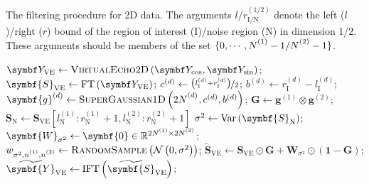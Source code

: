 \begin{algorithm}[h!]
    \begin{algorithmic}[1]
        \caption[
            The filtering procedure for 2D data.
        ]{
            The filtering procedure for 2D data. The arguments
            $l/r_{\text{I/N}}^{(1/2)}$ denote the left ($l$)/right ($r$) bound
            of the region of interest (I)/noise region (N) in dimension 1/2.
            These arguments should be members of the set $\lbrace 0, \cdots,
            \None - 1/\Ntwo - 1\rbrace$.
        }
        \label{alg:filter-2d}
            \State $\bY_{\text{VE}} \gets \textsc{VirtualEcho$2$D}\left(\bY_{\cos}, \bY_{\sin}\right)$;
            \State $\symbf{S}_{\text{VE}} \gets \FT\left(\bY_{\text{VE}}\right)$;
                \State $c^{(d)} \gets \nicefrac{\left(l_{\text{I}}^{(d)} + r_{\text{I}}^{(d)}\right)}{2}$;
                \State $b^{(d)} \gets r_{\text{I}}^{(d)} - l_{\text{I}}^{(d)}$;
                \State $\symbf{g}^{(d)} \gets \textsc{SuperGaussian$1$D}\left( 2\Nd_{\vphantom{\text{idx}}}, c^{(d)}, b^{(d)} \right)$;
                \State $\symbf{G} \gets  \symbf{g}^{(1)} \otimes \symbf{g}^{(2)}$;
            \EndFor
            \State $\symbf{S}_{\text{N}} \gets \symbf{S}_{\text{VE}} \left[
                    l^{(1)}_{\text{N}} :
                    r^{(1)}_{\text{N}} + 1,
                    l^{(2)}_{\text{N}} :
                    r^{(2)}_{\text{N}} + 1
                \right] $
            \State $\sigma^2 \gets \Var\left(\symbf{S}_{\text{N}}\right)$;
            \State $\symbf{W}_{\sigma^2} \gets \symbf{0} \in \mathbb{R}^{2\None \times 2\Ntwo}$;
                \State $w_{\sigma^2, \none, \ntwo} \gets \textsc{RandomSample}\left(\mathcal{N}\left(0, \sigma^2\right)\right)$;
                \EndFor
            \EndFor
            \State $\widetilde{\symbf{S}}_{\text{VE}} \gets \symbf{S}_{\text{VE}} \odot \symbf{G} + \symbf{W}_{\sigma^2} \odot \left(\symbf{1} - \symbf{G}\right)$;
            \State $\widetilde{\symbf{Y}}_{\text{VE}} \gets \IFT \left( \widetilde{\symbf{S}}_{\text{VE}} \right)$;

\end{algorithmic}
\end{algorithm}
